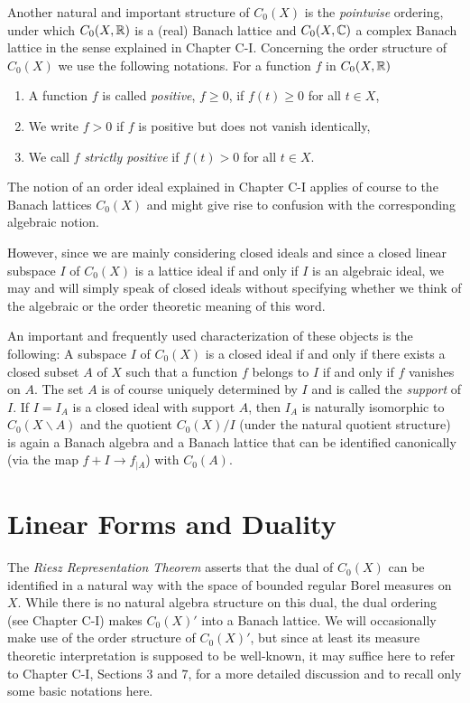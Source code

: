 Another natural and important structure of $C_{0}(X)$ is the \emph{pointwise} ordering, under which $C_{0}(X,\mathbb{R})$ is a (real) Banach lattice and $C_{0}(X,\mathbb{C})$ a complex Banach lattice in the sense explained in Chapter C-I.
Concerning the order structure of $C_{0}(X)$ we use the following notations.
For a function $f$ in $C_{0}(X,\mathbb{R})$
\begin{enumerate}
\item
A function $ f $ is called \emph{positive}, $ f \geq 0 $, if $ f(t) \geq 0  $ for all $ t \in X $, 

\item
We write $  f > 0 $ if $ f $ is positive but does not vanish identically,

\item
We call $ f $ \emph{strictly positive} if $ f(t) > 0 $ for all $ t \in X $.

\end{enumerate}
The notion of an order ideal explained in Chapter C-I applies of course to the Banach lattices $C_{0}(X)$ and might give rise to confusion with the corresponding algebraic notion.

However, since we are mainly considering closed ideals and since a closed linear subspace $I$ of $C_{0}(X)$ is a lattice ideal if and only if $I$ is an algebraic ideal, we may and will simply speak of closed ideals without specifying whether we think of the algebraic or the order theoretic meaning of this word.

An important and frequently used characterization of these objects is the following: A subspace $I$ of $C_{0}(X)$ is a closed ideal if and only if there exists a closed subset $A$ of $X$ such that a function $f$ belongs to $I$ if and only if $f$ vanishes on $A$.
The set $A$ is of course uniquely determined by $I$ and is called the \emph{support} of $I$.
If $I = I_{A}$ is a closed ideal with support $A$, then $I_{A}$ is naturally isomorphic to $C_{0}(X\backslash A)$ and the quotient $C_{0}(X)/I$ (under the natural quotient structure) is again a Banach algebra and a Banach lattice that can be identified canonically (via the map $f + I \to f_{|A}$) with $C_{0}(A)$.
\section{Linear Forms and Duality}\label{sec:b1-2}
The \emph{Riesz Representation Theorem} asserts that the dual of $C_{0}(X)$ can be identified in a natural way with the space of bounded regular Borel measures on $X$.
While there is no natural algebra structure on this dual, the dual ordering (see Chapter C-I) makes $C_{0}(X)'$ into a Banach lattice.
We will occasionally make use of the order structure of $C_{0}(X)'$, but since at least its measure theoretic interpretation is supposed to be well-known, it may suffice here to refer to Chapter C-I, Sections 3 and 7, for a more detailed discussion and to recall only some basic notations here.

